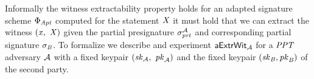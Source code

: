 \begin{definition}
    Informally the witness extractability property holds for an adapted signature scheme $\Phi_{\mathit{Apt}}$ computed for the statement $\mathit{X}$ it must hold that we can extract the witness
    $(\mathit{x} ,~ \mathit{X})$ given the partial presignature $\sigma_{\mathit{prt}}^{\mathcal{A}}$ and corresponding partial signature $\sigma_{\mathit{B}}$. To formalize we describe and experiment $\mathsf{aExtrWit_{\mathcal{A}}}$ for
    a $\mathit{PPT}$ adversary $\mathcal{A}$ with a fixed keypair $(\mathit{sk}_{\mathcal{A}} ,~ \mathit{pk}_{\mathcal{A}})$ and the fixed keypair $(\mathit{sk}_{\mathit{B}}, \mathit{pk}_{\mathit{B}})$ of the second party.\\
    \begin{center}
        \fbox{
            \begin{varwidth}{\textwidth}
                \procedure[linenumbering, syntaxhighlight=auto]{$\procExpExt{\varN}$} {
                    \varSet \opAssign \cnstEmptySet \\
                    (\varNonceAdv \opSeperate \varRandAdv) \opFunResult \procSetupPartSig{\varSecParam} \\
                    (\varMsg \opSeperate \varStatement) \opFunResult \cnstAdversary^{\procNonceOracle{\cdot},\procSignPtOracle{\cdot}{\varPubKeyAdv}{\varRandAdv}}(\varPubKeyAdv \opSeperate \varRandAdv) \\
                    \varSigPartAdv \opFunResult \procGenPtAptSig{\varMsg}{\varSecKeyAdv}{\varNonceAdv}{\varPubKeyBob}{\varRandBob}{\varWit} \\
                    (\varSigBob) \opFunResult \cnstAdversary^{\procNonceOracle{\cdot},\procSignPtOracle{\cdot}{\varPubKeyAdv}{\varRandAdv}}(\varPubKeyAdv \opSeperate \varRandAdv \opSeperate \varSigPartAdv) \\
                    \varSigFin \opFunResult \procFinAptSig{\varSigPartAdv}{\varSigBob}{\varRandAdv}{\varRandBob}{\varWit} \\
                    \funStar{\varWit} \opFunResult \procExtWit{\varSigFin}{\varSigBob}{\varSigPartAdv} \\
                    \pcreturn (\varMsg \opNotIn \varSet \opAnd (\varStatement \opSeperate \funStar{\varWit}) \opNotIn \cnstRelation \opAnd \procVerf{\varMsg}{\varSigFin}{\varPubKeyAdv \opAddPoint \varPubKeyBob})
                }\\


\end{varwidth}}
\end{center}
\end{definition}
